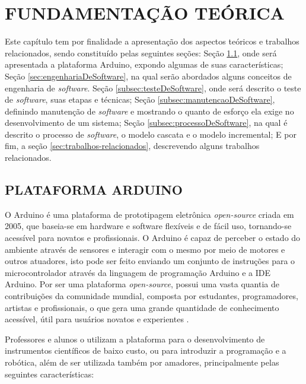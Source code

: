 
\chapter{FUNDAMENTAÇÃO TEÓRICA}
\label{chap:fundamentacao-teorica}Este capítulo tem por finalidade a apresentação dos aspectos teóricos e trabalhos relacionados, sendo constituído pelas seguintes seções: Seção \ref{sec:arduino}, onde será apresentada a plataforma Arduino, expondo algumas de suas características; Seção \ref{sec:engenhariaDeSoftware}, na qual serão abordados alguns conceitos de engenharia de \textit{software}. Seção \ref{subsec:testeDeSoftware}, onde será descrito o teste de \textit{software}, suas etapas e técnicas; Seção \ref{subsec:manutencaoDeSoftware}, definindo manutenção de \textit{software} e mostrando o quanto de esforço ela exige no desenvolvimento de um sistema; Seção \ref{subsec:processoDeSoftware}, na qual é descrito o processo de \textit{software}, o modelo cascata e o modelo incremental; E por fim, a seção \ref{sec:trabalhos-relacionados}, descrevendo alguns trabalhos relacionados.

\section{PLATAFORMA ARDUINO}
\label{sec:arduino} O Arduino é uma plataforma de prototipagem eletrônica \textit{open-source} criada em 2005, que baseia-se em hardware e software flexíveis e de fácil uso, tornando-se acessível para novatos e profissionais. O Arduino é capaz de perceber o estado do ambiente através de sensores e interagir com o mesmo por meio de motores e outros atuadores, isto pode ser feito enviando um conjunto de instruções para o microcontrolador através da linguagem de programação Arduino e a IDE Arduino. Por ser uma plataforma \textit{open-source}, possui uma vasta quantia de contribuições da comunidade mundial, composta por estudantes, programadores, artistas e profissionais, o que gera uma grande quantidade de conhecimento acessível, útil para usuários novatos e experientes \cite{arduino2018}.

Professores e alunos o utilizam a plataforma para o desenvolvimento de instrumentos científicos de baixo custo, ou para introduzir a programação e a robótica, além de ser utilizada também por amadores, principalmente pelas seguintes características: 

